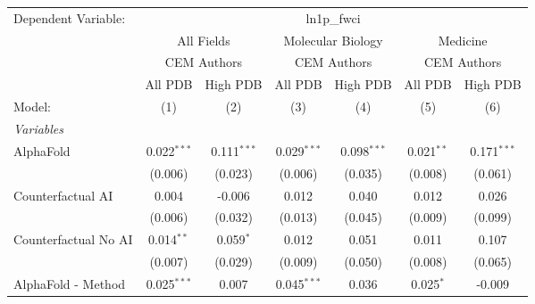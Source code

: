 \begingroup
\centering
\begin{tabular}{lcccccc}
   \tabularnewline \midrule \midrule
   Dependent Variable: & \multicolumn{6}{c}{ln1p\_fwci}\\
 & \multicolumn{2}{c}{All Fields} & \multicolumn{2}{c}{Molecular Biology} & \multicolumn{2}{c}{Medicine} \\
\cmidrule(lr){2-3} \cmidrule(lr){4-5} \cmidrule(lr){6-7}
 & \multicolumn{2}{c}{CEM Authors} & \multicolumn{2}{c}{CEM Authors} & \multicolumn{2}{c}{CEM Authors} \\
\cmidrule(lr){2-3} \cmidrule(lr){4-5} \cmidrule(lr){6-7}
 & \multicolumn{1}{c}{All PDB} & \multicolumn{1}{c}{High PDB} & \multicolumn{1}{c}{All PDB} & \multicolumn{1}{c}{High PDB} & \multicolumn{1}{c}{All PDB} & \multicolumn{1}{c}{High PDB} \\
\cmidrule(lr){2-2} \cmidrule(lr){3-3} \cmidrule(lr){4-4} \cmidrule(lr){5-5} \cmidrule(lr){6-6} \cmidrule(lr){7-7}
   Model:                                                     & (1)            & (2)           & (3)           & (4)           & (5)            & (6)\\  
   \midrule
   \emph{Variables}\\
   AlphaFold                                                  & 0.022$^{***}$  & 0.111$^{***}$ & 0.029$^{***}$ & 0.098$^{***}$ & 0.021$^{**}$   & 0.171$^{***}$\\   
                                                              & (0.006)        & (0.023)       & (0.006)       & (0.035)       & (0.008)        & (0.061)\\   
   Counterfactual AI                                          & 0.004          & -0.006        & 0.012         & 0.040         & 0.012          & 0.026\\   
                                                              & (0.006)        & (0.032)       & (0.013)       & (0.045)       & (0.009)        & (0.099)\\   
   Counterfactual No AI                                       & 0.014$^{**}$   & 0.059$^{*}$   & 0.012         & 0.051         & 0.011          & 0.107\\   
                                                              & (0.007)        & (0.029)       & (0.009)       & (0.050)       & (0.008)        & (0.065)\\   
   AlphaFold - Method                                         & 0.025$^{***}$  & 0.007         & 0.045$^{***}$ & 0.036         & 0.025$^{*}$    & -0.009\\   

\end{tabular}
